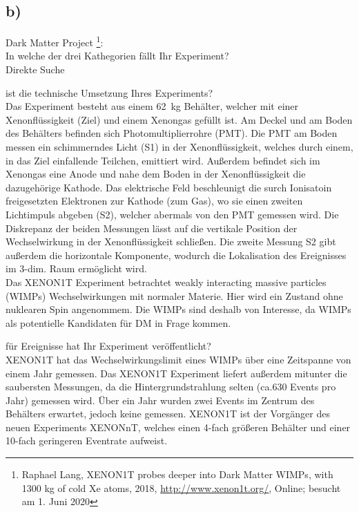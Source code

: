 \subsection{b)}

    \justifying Dark Matter Project \footnote{Raphael Lang, XENON1T probes deeper into Dark Matter WIMPs, with 1300 kg of cold Xe atoms, 
    2018, \url{http://www.xenon1t.org/}, Online; besucht am 1. Juni 2020}:\\
    In welche der drei Kathegorien fällt Ihr Experiment?\\
    Direkte Suche

    \justifying ist die technische Umsetzung Ihres Experiments?\\
    Das Experiment besteht aus einem \SI{62}{\kilo\gram} Behälter, welcher mit einer Xenonflüssigkeit (Ziel) und einem Xenongas gefüllt ist. Am Deckel und am Boden des
    Behälters befinden sich Photomultiplierrohre (PMT). Die PMT am Boden messen ein schimmerndes Licht (S1) in der Xenonflüssigkeit, welches durch einem, in das Ziel einfallende 
    Teilchen, emittiert wird. Außerdem befindet sich im Xenongas eine Anode und nahe dem Boden in der Xenonflüssigkeit die dazugehörige Kathode. Das elektrische Feld beschleunigt 
    die surch Ionisatoin freigesetzten Elektronen zur Kathode (zum Gas), wo sie einen zweiten Lichtimpuls abgeben (S2), welcher abermals von den PMT gemessen wird. Die Diskrepanz der beiden Messungen lässt auf 
    die vertikale Position der Wechselwirkung in der Xenonflüssigkeit schließen. Die zweite Messung S2 gibt außerdem die horizontale Komponente, wodurch die Lokalisation des 
    Ereignisses im 3-dim. Raum ermöglicht wird.\\
    Das XENON1T Experiment betrachtet weakly interacting massive particles (WIMPs) Wechselwirkungen mit normaler Materie. Hier wird ein Zustand ohne nuklearen Spin angenommem. 
    Die WIMPs sind deshalb von Interesse, da WIMPs als potentielle Kandidaten für DM in Frage kommen. 

    \justifying für Ereignisse hat Ihr Experiment veröffentlicht?\\
    XENON1T hat das Wechselwirkungslimit eines WIMPs über eine Zeitspanne von einem Jahr gemessen. Das XENON1T Experiment liefert außerdem mitunter die saubersten Messungen, da
    die Hintergrundstrahlung selten (ca.630 Events pro Jahr) gemessen wird. Über ein Jahr wurden zwei Events im Zentrum des Behälters erwartet, jedoch keine gemessen. XENON1T 
    ist der Vorgänger des neuen Experiments XENONnT, welches einen 4-fach größeren Behälter und einer 10-fach geringeren Eventrate aufweist.


